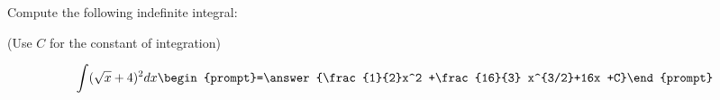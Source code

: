 \documentclass{ximera}
\author{Jim Talamo}
\begin{document}
\begin{exercise}
Compute the following indefinite integral:

\begin{prompt} (Use $C$ for the constant of integration) \end{prompt}

\[
\int (\sqrt{x}+4)^2  dx 
\begin{prompt}=\answer{\frac{1}{2}x^2 +\frac{16}{3} x^{3/2}+16x +C}\end{prompt}
\]
\end{exercise}
\end{document}
